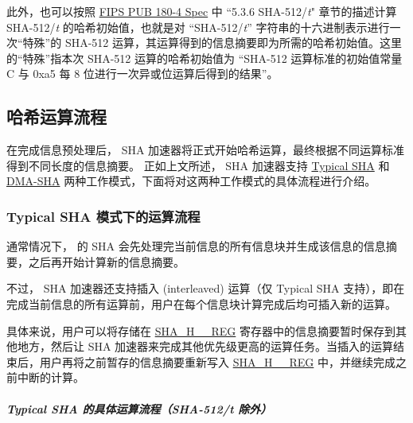 \documentclass[main\_\_CN.tex]{subfiles}
\begin{document}
此外，也可以按照 \href{https://doi.org/10.6028/NIST.FIPS.180-4}{FIPS PUB 180-4 Spec} 中 ``5.3.6 SHA-512/{\it{t}}" 章节的描述计算 SHA-512/{\it{t}} 的哈希初始值，也就是对 “SHA-512/{\it{t}}” 字符串的十六进制表示进行一次“特殊”的 SHA-512 运算，其运算得到的信息摘要即为所需的哈希初始值。这里的“特殊”指本次 SHA-512 运算的哈希初始值为 “SHA-512 运算标准的初始值常量 C 与 0xa5 每 8 位进行一次异或位运算后得到的结果”。

\subsection{哈希运算流程}\label{sec:sha-hash-operation}

在完成信息预处理后，\chipname{} SHA 加速器将正式开始哈希运算，最终根据不同运算标准得到不同长度的信息摘要。
正如上文所述，\chipname{} SHA 加速器支持 \hyperref[sec:sha-typical-sha]{Typical SHA} 和 \hyperref[sec:sha-dma-sha]{DMA-SHA} 两种工作模式，下面将对这两种工作模式的具体流程进行介绍。

\subsubsection{Typical SHA 模式下的运算流程}\label{sec:sha-typical-sha}

通常情况下，\chipname{} 的 SHA 会先处理完当前信息的所有信息块并生成该信息的信息摘要，之后再开始计算新的信息摘要。

不过，\chipname{} SHA 加速器还支持插入 (interleaved) 运算（仅 Typical SHA 支持），即在完成当前信息的所有运算前，用户在每个信息块计算完成后均可插入新的运算。

具体来说，用户可以将存储在 \hyperref[regdesc:SHAHNREG]{SHA\_H\_\_REG} 寄存器中的信息摘要暂时保存到其他地方，然后让 SHA 加速器来完成其他优先级更高的运算任务。当插入的运算结束后，用户再将之前暂存的信息摘要重新写入 \hyperref[regdesc:SHAHNREG]{SHA\_H\_\_REG} 中，并继续完成之前中断的计算。

\subparagraph{Typical SHA 的具体运算流程（SHA-512/{\it{t}} 除外）}
\end{document}
